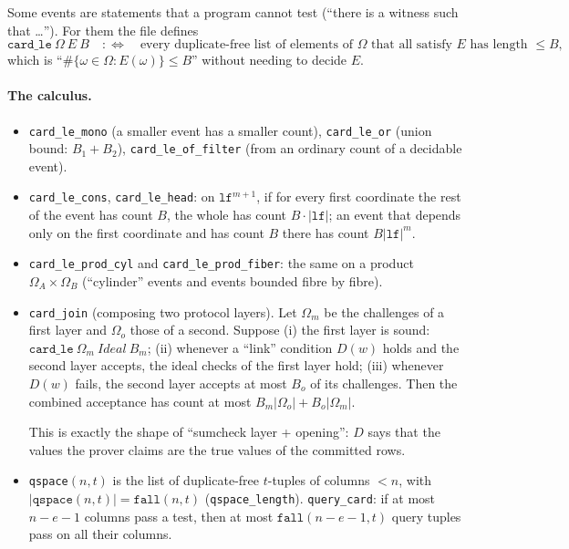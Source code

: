 \documentclass[11pt,a4paper]{article}
\theoremstyle{definition}
\theoremstyle{plain}
\begin{document}
Some events are statements that a program cannot test (``there is a witness such that \dots'').
For them the file defines
\[
  \mathtt{card\_le}\ \Omega\ E\ B\quad:\Longleftrightarrow\quad
  \text{every duplicate-free list of elements of } \Omega \text{ that all satisfy } E \text{ has length } \le B,
\]
which is ``$\#\{\omega\in\Omega:E(\omega)\}\le B$'' without needing to decide $E$.

\paragraph{The calculus.}
\begin{itemize}[leftmargin=1.3em]
\item \texttt{card\_le\_mono} (a smaller event has a smaller count), \texttt{card\_le\_or} (union
  bound: $B_1+B_2$), \texttt{card\_le\_of\_filter} (from an ordinary count of a decidable event).
\item \texttt{card\_le\_cons}, \texttt{card\_le\_head}: on $\mathtt{lf}^{m+1}$, if for every first
  coordinate the rest of the event has count $B$, the whole has count $B\cdot|\mathtt{lf}|$; an event
  that depends only on the first coordinate and has count $B$ there has count $B|\mathtt{lf}|^m$.
\item \texttt{card\_le\_prod\_cyl} and \texttt{card\_le\_prod\_fiber}: the same on a product
  $\Omega_A\times\Omega_B$ (``cylinder'' events and events bounded fibre by fibre).
\item \texttt{card\_join} (composing two protocol layers). Let $\Omega_m$ be the challenges of a
  first layer and $\Omega_o$ those of a second. Suppose
  (i) the first layer is sound: $\mathtt{card\_le}\ \Omega_m\ \mathit{Ideal}\ B_m$;
  (ii) whenever a ``link'' condition $D(w)$ holds and the second layer accepts, the ideal checks of
  the first layer hold;
  (iii) whenever $D(w)$ fails, the second layer accepts at most $B_o$ of its challenges.
  Then the combined acceptance has count at most $B_m|\Omega_o|+B_o|\Omega_m|$.

  This is exactly the shape of ``sumcheck layer + opening'': $D$ says that the values the prover
  claims are the true values of the committed rows.
\item \texttt{qspace}$(n,t)$ is the list of duplicate-free $t$-tuples of columns $<n$, with
  $|\texttt{qspace}(n,t)|=\mathtt{fall}(n,t)$ (\texttt{qspace\_length}). \texttt{query\_card}: if at
  most $n-e-1$ columns pass a test, then at most $\mathtt{fall}(n-e-1,t)$ query tuples pass on all
  their columns.
\end{itemize}
\end{document}
